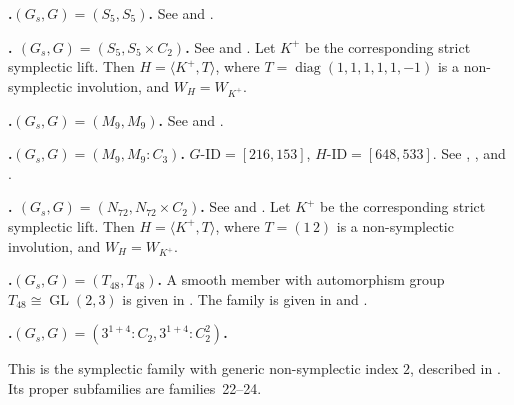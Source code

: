 \documentclass[12pt]{amsart}
\numberwithin{equation}{section}
\theoremstyle{plain}
\theoremstyle{definition}
\theoremstyle{remark}
\DeclareMathOperator{\GL}{GL}
\DeclareMathOperator{\diag}{diag}
\begin{document}
\par{}\medskip\noindent\textbf{.\enspace $(G_s,G)=(S_5,S_5)$.}\label{fam:fourfold-no-15}
See \cite[\S7.3, (7.6)]{KOIKE202512} and
\cite[\S6.2.2]{FWZ26}.

\par{}\medskip\noindent\textbf{.\enspace
$(G_s,G)=(S_5,S_5\times C_2)$.}\label{fam:fourfold-no-16}
See \cite[\S7.3, (7.3)]{KOIKE202512} and
\cite[\S6.2.1]{FWZ26}.
Let $K^+$ be the corresponding strict symplectic lift.  Then
$H=\langle K^+,T\rangle$, where $T=\diag(1,1,1,1,1,-1)$ is a non-symplectic
involution, and $W_H=W_{K^+}$.

\par{}\medskip\noindent\textbf{.\enspace $(G_s,G)=(M_9,M_9)$.}\label{fam:fourfold-no-17}
See \cite[\S7.4, (7.9)]{KOIKE202512} and
\cite[\S6.3]{FWZ26}.

\par{}\medskip\noindent\textbf{.\enspace $(G_s,G)=(M_9,M_9:C_3)$.}\label{fam:fourfold-no-18}
$G\text{-ID}=[216,153]$, $H\text{-ID}=[648,533]$.
See \cite[\S6.1, (15)]{yang2024automorphism},
\cite[\S7.4, (7.9)]{KOIKE202512}, and
\cite[\S6.3]{FWZ26}.

\par{}\medskip\noindent\textbf{.\enspace
$(G_s,G)=(N_{72},N_{72}\times C_2)$.}\label{fam:fourfold-no-19}
See \cite[\S7.5, (7.10)]{KOIKE202512} and
\cite[\S6.4.1]{FWZ26}.
Let $K^+$ be the corresponding strict symplectic lift.  Then
$H=\langle K^+,T\rangle$, where $T=(1\,2)$ is a non-symplectic
involution, and $W_H=W_{K^+}$.

\par{}\medskip\noindent\textbf{.\enspace $(G_s,G)=(T_{48},T_{48})$.}\label{fam:fourfold-no-20}
A smooth member with automorphism group
$T_{48}\cong\GL(2,3)$ is given in
\cite[\S6.1, (14)]{yang2024automorphism}.
The family is given in \cite[\S7.6, (7.12)]{KOIKE202512} and
\cite[Theorem~1.2]{FWZ26}.

\par{}\medskip\noindent\textbf{.\enspace $(G_s,G)=(3^{1+4}:C_2,3^{1+4}:C_2^2)$.}\label{fam:fourfold-no-21}

This is the symplectic family with generic non-symplectic index $2$,
described in \cite[(6.1)]{KOIKE202512}.  Its proper subfamilies are families~22--24.
\end{document}
